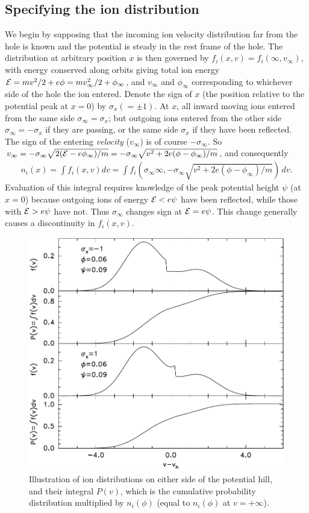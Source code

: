 \documentclass[pre]{revtex4-2}
\def\energy{{\cal E}}
\begin{document}
\subsection{Specifying the ion distribution}
We begin by supposing that the incoming ion velocity distribution far
from the hole is known and the potential is
steady in the rest frame of the hole.  The distribution at arbitrary
position $x$ is then governed by
$f_i(x,v)=f_{i}(\infty,v_\infty)$, with energy conserved along orbits
giving total ion energy $\energy=mv^2/2+e\phi=mv_{\infty}^2/2+\phi_\infty$, and
$v_{\infty}$ and $\phi_\infty$ corresponding to whichever side of the
hole the ion entered.  Denote the sign of $x$ (the position relative
to the potential peak at $x=0$) by
$\sigma_x(=\pm1)$. At $x$, all inward moving ions entered from the
same side $\sigma_{\infty}=\sigma_x$; but outgoing ions entered from
the other side $\sigma_\infty=-\sigma_x$ if they are passing, or the
same side $\sigma_x$ if they have been reflected. The sign of the
entering \emph{velocity} ($v_\infty$) is of course $-\sigma_\infty$.
So
$v_\infty=-\sigma_\infty\sqrt{2(\energy-e\phi_\infty)/m}=-\sigma_\infty\sqrt{v^2+2e(\phi-\phi_\infty)/m}$,
and consequently
\begin{equation}\label{ni}
  \begin{split}
  n_i(x)=\int f_i(x,v) dv=\int
  f_{i}(\sigma_\infty\infty,-\sigma_\infty\sqrt{v^2+2e(\phi-\phi_\infty)/m})\,dv.
    \end{split}
\end{equation}
Evaluation of this integral requires knowledge of the peak potential
height $\psi$ (at $x=0$) because outgoing ions of energy
$\energy<e\psi$ have been reflected, while those with $\energy>e\psi$ have
not. Thus $\sigma_\infty$ changes sign at $\energy=e\psi$. This change
generally causes a discontinuity in
$f_{i}(x,v)$.
\begin{figure}[htp]
  \centering
  \includegraphics[width=.6\hsize]{fiplots}
  \caption{Illustration of ion distributions on either side of the
    potential hill, and their integral $P(v)$, which is the cumulative
    probability distribution multiplied by $n_i(\phi)$  (equal
    to $n_i(\phi)$ at $v=+\infty$).}
  \label{fig:fiplots}
\end{figure}
\end{document}
